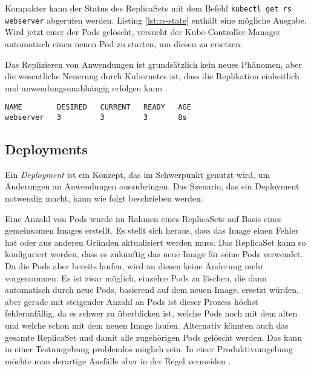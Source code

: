 \documentclass[11pt,a4paper]{article}
\begin{document}
Kompakter kann der Status des ReplicaSets mit dem Befehl \lstinline|kubectl get rs webserver|
abgerufen werden. Listing \ref{lst:rs-state} enthält eine mögliche Ausgabe.
Wird jetzt einer der Pods gelöscht, versucht der Kube-Controller-Manager automatisch
einen neuen Pod zu starten, um diesen zu ersetzen.

Das Replizieren von Anwendungen ist grundsätzlich kein neues Phänomen, aber
die wesentliche Neuerung durch Kubernetes ist, dass die Replikation einheitlich
und anwendungsunabhängig erfolgen kann \cite{Schmeling_Dargatz_2022}.

\begin{lstlisting}[caption={Ein ReplicaSet mit drei erfolgreich gestarteten Instanze.}, label={lst:rs-state}]
NAME        DESIRED   CURRENT   READY   AGE
webserver   3         3         3       8s
\end{lstlisting}

\subsection{Deployments}
Ein \emph{Deployment} ist ein Konzept, das im Schwerpunkt genutzt wird, um Änderungen an Anwendungen auszubringen.
Das Szenario, das ein Deployment notwendig macht, kann wie folgt beschrieben werden:

Eine Anzahl von Pods wurde im Rahmen eines ReplicaSets auf Basis eines gemeinsamen Images erstellt.
Es stellt sich heraus, dass das Image einen Fehler hat oder aus anderen Gründen aktualisiert werden muss.
Das ReplicaSet kann so konfiguriert werden, dass es zukünftig das neue Image für seine Pods verwendet.
Da die Pods aber bereits laufen, wird an diesen keine Änderung mehr vorgenommen. Es ist zwar möglich,
einzelne Pods zu löschen, die dann automatisch durch neue Pods, basierend auf dem neuen Image, ersetzt würden, aber
gerade mit steigender Anzahl an Pods ist dieser Prozess höchst
fehleranfällig, da es schwer zu überblicken ist, welche Pods noch mit dem alten und welche schon mit dem
neuen Image laufen. Alternativ könnten auch das gesamte ReplicaSet und damit alle zugehörigen Pods gelöscht werden.
Das kann in einer Testumgebung problemlos möglich sein. In einer Produktivumgebung möchte man derartige
Ausfälle aber in der Regel vermeiden \cite{Schmeling_Dargatz_2022}. %
\end{document}
